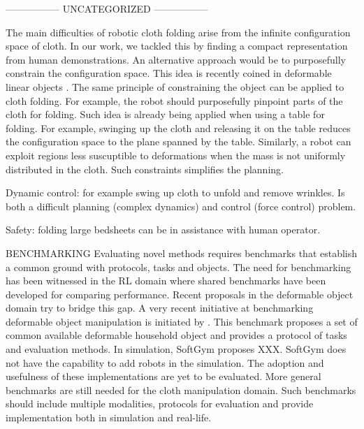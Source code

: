 \documentclass[\home/main.tex]{subfiles}
\begin{document}
-----------------
UNCATEGORIZED
----------------- 

The main difficulties of robotic cloth folding arise from the infinite configuration space of cloth. In our work, we tackled this by finding a compact representation from human demonstrations. An alternative approach would be to purposefully constrain the configuration space. This idea is recently coined in deformable linear objects \autocite{Zhu2020}. The same principle of constraining the object can be applied to cloth folding. For example, the robot should purposefully pinpoint parts of the cloth for folding. Such idea is already being applied when using a table for folding. For example, swinging up the cloth and releasing it on the table reduces the configuration space to the plane spanned by the table. Similarly, a robot can exploit regions less suscuptible to deformations when the mass is not uniformly distributed in the cloth. Such constraints simplifies the planning. 

Dynamic control: for example swing up cloth to unfold and remove wrinkles. Is both a difficult planning (complex dynamics) and control (force control) problem.


Safety: folding large bedsheets can be in assistance with human operator. 

BENCHMARKING
Evaluating novel methods requires benchmarks that establish a common ground with protocols, tasks and objects. The need for benchmarking has been witnessed in the RL domain where shared benchmarks have been developed \autocite{brockman2016openai} for comparing performance. Recent proposals in the deformable object domain try to bridge this gap. A very recent initiative at benchmarking deformable object manipulation is initiated by \autocite{garciacamacho2021household}. This benchmark proposes a set of common available deformable household object and provides a protocol of tasks and evaluation methods. In simulation, SoftGym proposes XXX. SoftGym does not have the capability to add robots in the simulation. 
The adoption and usefulness of these implementations are yet to be evaluated. More general benchmarks are still needed for the cloth manipulation domain. Such benchmarks should include multiple modalities, protocols for evaluation and provide implementation both in simulation and real-life. 
\end{document}
